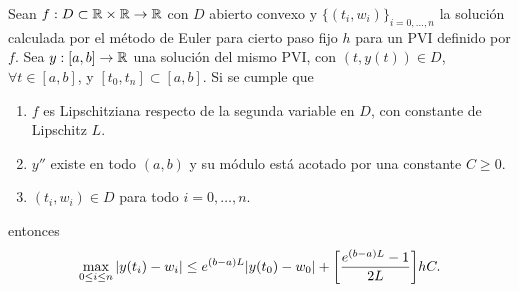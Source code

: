 \begin{theorem}
    Sean $f : D \subset \mathbb{R} \times \mathbb{R} \to \mathbb{R}$ con $D$ abierto convexo
    y $\{(t_i, w_i)\}_{i = 0,\ldots, n}$
    la solución calculada por el método de Euler para cierto paso fijo $h$
    para un PVI definido por $f$.
    Sea $y : [a, b] \to \mathbb{R}$ una solución del mismo PVI,
    con $(t, y(t)) \in D$, $\forall t \in [a, b]$,
    y $[t_0, t_n] \subset [a, b]$.
    Si se cumple que
    \begin{enumerate}[label=(\alph*)]
        \item $f$ es Lipschitziana respecto de la segunda variable en $D$,
        con constante de Lipschitz $L$.
        \item $y''$ existe en todo $(a, b)$ y
        su módulo está acotado por una constante $C \ge 0$.
        \item $(t_i, w_i) \in D$ para todo $i = 0,\dots,n$.
    \end{enumerate}
    entonces
    \begin{equation*}
        \max_{0 \le i \le n} \abs{y(t_i)-w_i} \le
        e^{(b-a)L}\abs{y(t_0) - w_0} + \qty[\frac{e^{(b-a)L}-1}{2L}]hC.
    \end{equation*}
\end{theorem}

